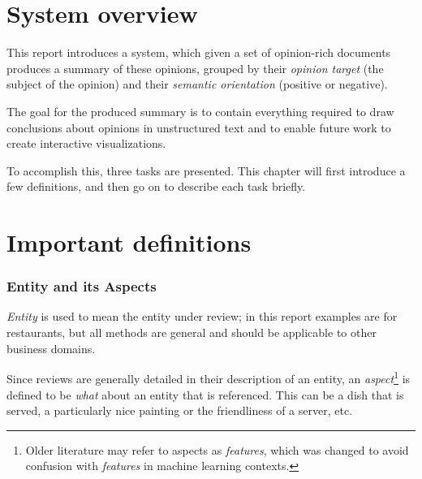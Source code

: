 \documentclass[a4paper,11pt]{kth-mag}
\newcommand{\gls}[1]{TODO(#1)}
\begin{document}
%
%



\section{System overview}
This report introduces a system, which given a set of opinion-rich documents produces a summary of these
opinions, grouped by their \emph{opinion target} (the subject of the opinion)
and their \emph{semantic orientation} (positive or negative).

The goal for the produced summary is to contain everything required to draw conclusions about opinions in
unstructured text and to enable future work to create interactive visualizations.

To accomplish this, three tasks are presented. This chapter will first introduce a few definitions,
and then go on to describe each task briefly.


\clearpage
\section{Important definitions}

\subsubsection{Entity and its Aspects}
\emph{Entity} is used to mean the entity under review; in this report examples are for restaurants, but all methods
are general and should be applicable to other business domains.

Since reviews are generally detailed in their description of an entity,
an \emph{aspect}\footnote{
  Older literature may refer to aspects as \emph{features}, which was changed to
  avoid confusion with \emph{features} in machine learning contexts.}
is defined to be \emph{what} about an entity that is referenced. This can be a dish that is served, a particularly nice painting or the friendliness of a server, etc.
\end{document}
